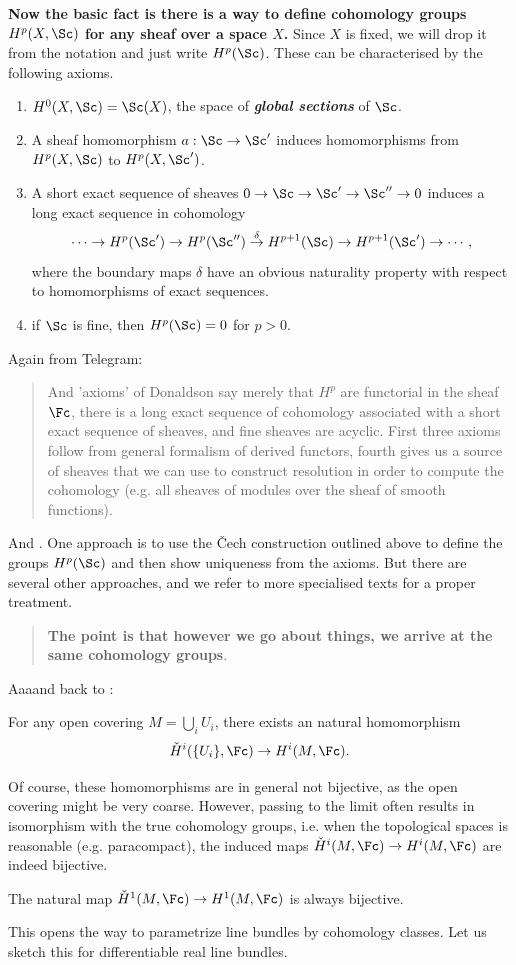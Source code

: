 \textbf{Now the basic fact is there is a way to define cohomology groups $H^p(X,\Sc)$ for any sheaf over a space $X$.} Since $X$ is fixed, we will drop it from the notation and just write $H^p(\Sc)$. These can be characterised by the following axioms.
\begin{enumerate}
	\item $H^0(X,\Sc)=\Sc(X)$, the space of \textbf{\textit{global sections}} of $\Sc$.
	\item A sheaf homomorphism $a:\Sc\to\Sc'$ induces homomorphisms from $H^p(X,\Sc)$ to $H^p(X,\Sc')$.
	\item A short exact sequence of sheaves $0\to\Sc\to\Sc'\to\Sc''\to0$ induces a long exact sequence in cohomology
	\[\cdots\to H^p(\Sc')\to H^p(\Sc'')\overset{\delta}{\to}H^{p+1}(\Sc)\to H^{p+1}(\Sc')\to\cdots,\]
	where the boundary maps $\delta$ have an obvious naturality property with respect to homomorphisms of exact sequences.
	\item if $\Sc$ is fine, then $H^p(\Sc)=0$ for $p>0$.
\end{enumerate}

Again from Telegram:
\begin{quote}
	And 'axioms' of Donaldson say merely that $H^p$ are functorial in the sheaf $\Fc$, there is a long exact sequence of cohomology associated with a short exact sequence of sheaves, and fine sheaves are acyclic. First three axioms follow from general formalism of derived functors, fourth gives us a source of sheaves that we can use to construct resolution in order to compute the cohomology (e.g. all sheaves of modules over the sheaf of smooth functions).
\end{quote}

And \cite{donaldson}. One approach is to use the \v Cech construction outlined above to define the groups $H^p(\Sc)$ and then show uniqueness from the axioms. But there are several other approaches, and we refer to more specialised texts for a proper treatment.

\begin{quote}
	{\color{red}\textbf{The point is that however we go about things, we arrive at the same cohomology groups}.}
\end{quote}

Aaaand back to \cite{huybrechts}:
\begin{prop}
	For any open covering $M=\bigcup_iU_i$, there exists an natural homomorphism
	\[\check{H}^i(\{U_i\},\Fc)\to H^i(M,\Fc).\]
\end{prop}
Of course, these homomorphisms are in general not bijective, as the open
covering might be very coarse. However, passing to the limit often results in isomorphism with the true cohomology groups, i.e. when the topological spaces is reasonable (e.g. paracompact), the induced maps $\check{H}^i(M,\Fc)\to H^i(M,\Fc)$ are indeed bijective.
\begin{prop}
	The natural map $\check{H}^1(M,\Fc)\to H^1(M,\Fc)$ is always bijective.
\end{prop}
This opens the way to parametrize line bundles by cohomology classes. Let us sketch this for differentiable real line bundles.


